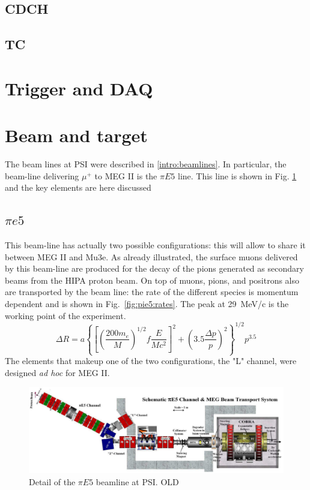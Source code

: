 \begin{refsection}
    \subsection{CDCH}
    \subsection{TC}

\section{Trigger and DAQ}

\section{Beam and target}
    The beam lines at PSI were described in \ref{intro:beamlines}. 
    In particular, the beam-line delivering $\mu^+$ to MEG II is the $\pi E5$ line. 
    This line is shown in  Fig. \ref{fig:pie5} and the key elements are here discussed

    \subsection{$\pi e5$}
        This beam-line has actually two possible configurations: this will allow to share it between MEG II and Mu3e. 
        As already illustrated, the surface muons delivered by this beam-line are produced for the decay of the pions generated as secondary beams from the HIPA proton beam.
        On top of muons, pions, and positrons also are transported by the beam line: the rate of the different species is momentum dependent and is shown in Fig.~\ref{fig:pie5:rates}.
        The peak at \SI{29}{MeV/c} is the working point of the experiment.
        \begin{equation}
            \Delta R = a \left\{
                \left[  
                    \left( \frac{200 m_e}{M}\right)^{1/2} f \frac{E}{Mc^2}
                \right]^2 + 
                \left( 3.5\frac{\Delta p }{p}\right)^2
            \right\} ^{1/2} p^{3.5}
        \end{equation}
        The elements that makeup one of the two configurations, the "L" channel, were designed \textit{ad hoc} for MEG II.

        \begin{figure}
            \centering
            \includegraphics[width = \textwidth]{Figures/MEG/pie5_beamline.png}
            \caption{Detail of the $\pi E5$ beamline at PSI. OLD}
            \label{fig:pie5}
        \end{figure}


\end{refsection}
